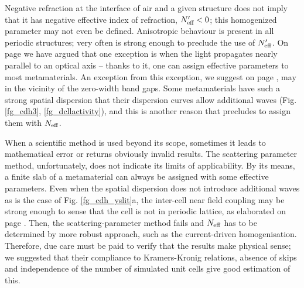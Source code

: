 Negative refraction at the interface of air and a given structure does not imply that it has negative effective index of refraction, $N_{\text{eff} }'<0$; this homogenized parameter may not even be defined. Anisotropic behaviour is present in all periodic structures; very often is strong enough to preclude the use of $N_{\text{eff} }'$. On page \pageref{indexofrefraction} we have argued that one exception is when the light propagates nearly parallel to an optical axis -- thanks to it, one can assign effective parameters to most metamaterials. An exception from this exception, we suggest on page \pageref{diracpoint}, may in the vicinity of the zero-width band gaps. 
Some metamaterials have such a strong spatial dispersion that their dispersion curves allow additional waves (Fig. \ref{fg_cdh3}, \ref{fg_dcllactivity}), and this is another reason that precludes to assign them with $N_{\text{eff} }$. 

When a scientific method is used beyond its scope, sometimes it leads to mathematical error or returns obviously invalid results. The scattering parameter method, unfortunately, does not indicate its limits of applicability. By its means, a finite slab of a metamaterial can always be assigned with some effective parameters. 
Even when the spatial dispersion does not introduce additional waves as is the case of Fig. \ref{fg_cdh_yslit}a, the inter-cell near field coupling may be strong enough to sense that the cell is not in periodic lattice, as elaborated on page \pageref{sparamweaknesses}. Then, the scattering-parameter method fails and $N_{\text{eff} }$ has to be determined by more robust approach, such as the current-driven homogenisation.
Therefore, due care must be paid to verify that the results make physical sense; we suggested that their compliance to Kramers-Kronig relations, absence of skips and independence of the number of simulated unit cells give good estimation of this.






